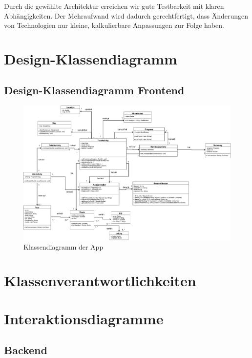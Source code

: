 \documentclass[a4paper,10pt,xetex]{article}
\begin{document}
Durch die gewählte Architektur erreichen wir gute Testbarkeit mit klaren
Abhängigkeiten. Der Mehraufwand wird dadurch gerechtfertigt, dass Änderungen
von Technologien nur kleine, kalkulierbare Anpassungen zur Folge haben.

\section{Design-Klassendiagramm}\label{design-klassendiagram}
\subsection{Design-Klassendiagramm Frontend}\label{design-klassendiagram-frontend}
\begin{figure}
  \includegraphics{classdiagram_frontend}
  \caption{Klassendiagramm der App}
\end{figure}

\section{Klassenverantwortlichkeiten}\label{klassenverantwortlichkeiten}

\section{Interaktionsdiagramme}\label{interaktionsdiagramme}
\subsection{Backend}\label{backend}
\end{document}
